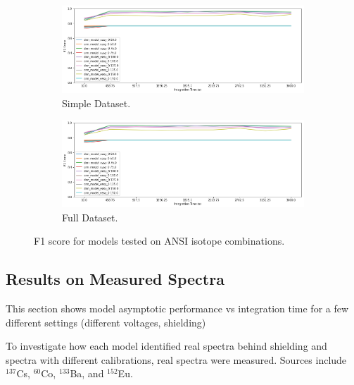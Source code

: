 \begin{figure}[H]
     \centering
     \begin{subfigure}[b]{0.9\textwidth}
         \centering
         \includegraphics[width=\textwidth]{images/results_easy_distance_comparison}
         \caption{Simple Dataset.}
         \label{fig:results_full_background_inject_simple}
     \end{subfigure}

     \begin{subfigure}[b]{0.9\textwidth}
         \centering
         \includegraphics[width=\textwidth]{images/results_easy_distance_comparison}
         \caption{Full Dataset.}
         \label{fig:results_full_background_inject_full}
     \end{subfigure}

        \caption{F1 score for models tested on ANSI isotope combinations.}
        \label{fig:results_full_background_inject}
\end{figure}



\subsection{Results on Measured Spectra}

This section shows model asymptotic performance vs integration time for a few different settings (different voltages, shielding)

To investigate how each model identified real spectra behind shielding and spectra with different calibrations, real spectra were measured. Sources include $^{137}$Cs, $^{60}$Co, $^{133}$Ba, and $^{152}$Eu. 


